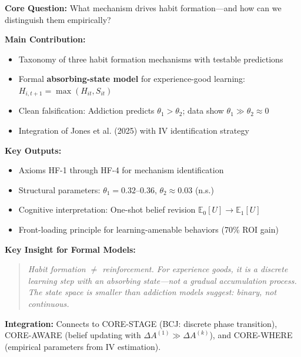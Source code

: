 \begin{tcolorbox}[colback=green!10!white, colframe=green!75!black,
    title=\textbf{Appendix HF: Summary}]

\textbf{Core Question:} What mechanism drives habit formation---and how can we distinguish them empirically?

\textbf{Main Contribution:}
\begin{itemize}[nosep]
    \item Taxonomy of three habit formation mechanisms with testable predictions
    \item Formal \textbf{absorbing-state model} for experience-good learning:
    $H_{i,t+1} = \max(H_{it}, S_{it})$
    \item Clean falsification: Addiction predicts $\theta_1 > \theta_2$; data show $\theta_1 \gg \theta_2 \approx 0$
    \item Integration of Jones et al. (2025) with IV identification strategy
\end{itemize}

\textbf{Key Outputs:}
\begin{itemize}[nosep]
    \item Axioms HF-1 through HF-4 for mechanism identification
    \item Structural parameters: $\theta_1 = 0.32$--$0.36$, $\theta_2 \approx 0.03$ (n.s.)
    \item Cognitive interpretation: One-shot belief revision $\mathbb{E}_0[U] \to \mathbb{E}_1[U]$
    \item Front-loading principle for learning-amenable behaviors (70\% ROI gain)
\end{itemize}

\textbf{Key Insight for Formal Models:}
\begin{quote}
\textit{Habit formation $\neq$ reinforcement. For experience goods, it is a discrete
learning step with an absorbing state---not a gradual accumulation process.
The state space is smaller than addiction models suggest: binary, not continuous.}
\end{quote}

\textbf{Integration:} Connects to CORE-STAGE (BCJ: discrete phase transition),
CORE-AWARE (belief updating with $\Delta A^{(1)} \gg \Delta A^{(k)}$),
and CORE-WHERE (empirical parameters from IV estimation).

\end{tcolorbox}


